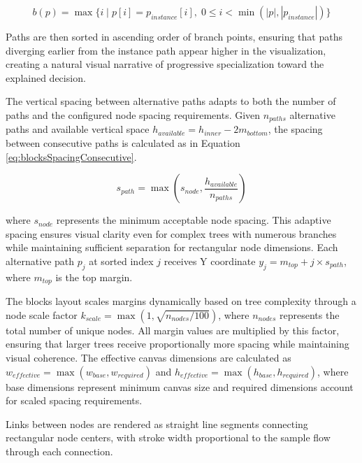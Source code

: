 \begin{equation}
b(p) = \max\{i \mid p[i] = p_{instance}[i], \; 0 \leq i < \min(|p|, |p_{instance}|)\}
\label{eq:blocksBranchPoint}
\end{equation}

Paths are then sorted in ascending order of branch points, ensuring that paths diverging earlier from the instance path appear higher in the visualization, creating a natural visual narrative of progressive specialization toward the explained decision.

The vertical spacing between alternative paths adapts to both the number of paths and the configured node spacing requirements. Given $n_{paths}$ alternative paths and available vertical space $h_{available} = h_{inner} - 2m_{bottom}$, the spacing between consecutive paths is calculated as in Equation \ref{eq:blocksSpacingConsecutive}.

\begin{equation}
s_{path} = \max\left(s_{node}, \frac{h_{available}}{n_{paths}}\right)
\label{eq:blocksSpacingConsecutive}
\end{equation}

where $s_{node}$ represents the minimum acceptable node spacing. This adaptive spacing ensures visual clarity even for complex trees with numerous branches while maintaining sufficient separation for rectangular node dimensions. Each alternative path $p_j$ at sorted index $j$ receives Y coordinate $y_j = m_{top} + j \times s_{path}$, where $m_{top}$ is the top margin.

The blocks layout scales margins dynamically based on tree complexity through a node scale factor $k_{scale} = \max(1, \sqrt{n_{nodes}/100})$, where $n_{nodes}$ represents the total number of unique nodes. All margin values are multiplied by this factor, ensuring that larger trees receive proportionally more spacing while maintaining visual coherence. The effective canvas dimensions are calculated as $w_{effective} = \max(w_{base}, w_{required})$ and $h_{effective} = \max(h_{base}, h_{required})$, where base dimensions represent minimum canvas size and required dimensions account for scaled spacing requirements.

Links between nodes are rendered as straight line segments connecting rectangular node centers, with stroke width proportional to the sample flow through each connection.


